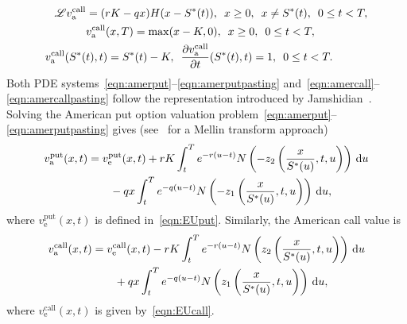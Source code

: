 	 \begin{align}
            \label{eqn:amercall}
            \mathscr{L}v_\text{a}^{\text{call}}&= (rK - qx)H(x-S^*(t)), \enskip x \geq 0, \enskip x \neq S^*(t), \enskip 0 \leq t < T,\\
            \label{eqn:amercallTerminal}
            &v_\text{a}^{\text{call}}(x,T) = \max(x-K,0), \enskip x \geq 0, \enskip 0 \leq t < T,\\
            \label{eqn:amercallpasting}
           v_\text{a}^{\text{call}}(S^*( & t),t) = S^*(t) - K, \enskip \frac{\partial v_\text{a}^{\text{call}}}{\partial t}(S^*(t),t) = 1, \enskip 0 \leq t < T.
    \end{align}
Both PDE systems~\eqref{eqn:amerput}--\eqref{eqn:amerputpasting} and~\eqref{eqn:amercall}--\eqref{eqn:amercallpasting}  follow the representation introduced by Jamshidian~\cite{Jamshidian1992}. Solving the American put option valuation problem~\eqref{eqn:amerput}--\eqref{eqn:amerputpasting} gives (see~\cite{Rodrigo2013} for a Mellin transform approach)
	\begin{equation}
		\label{eqn:americanput}
		\begin{split}
			v_\text{a}^{\text{put}}(x,t) &= v_\text{e}^{\text{put}}(x,t) + rK\int_t^T e^{-r(u-t)}N\left( -z_2\left( \frac{x}{S^*(u)},t,u \right) \right) \, \mathrm d u \\
			& \qquad - qx\int_t^T e^{-q(u-t)}N\left( -z_1\left( \frac{x}{S^*(u)},t,u \right) \right) \, \mathrm d u,
		\end{split}
	\end{equation}
where $v_\text{e}^{\text{put}}(x,t)$ is defined in~\eqref{eqn:EUput}. Similarly, the American call value is
	\begin{equation}
		\label{eqn:americancall}
		\begin{split}
			v_\text{a}^{\text{call}}(x,t) &= v_\text{e}^{\text{call}}(x,t) - rK\int_t^T e^{-r(u-t)}N\left( z_2\left( \frac{x}{S^*(u)},t,u \right) \right) \, \mathrm d u \\
			& \qquad + qx\int_t^T e^{-q(u-t)}N\left( z_1\left( \frac{x}{S^*(u)},t,u \right) \right) \, \mathrm d u,
		\end{split}
	\end{equation}
where $v_\text{e}^{\text{call}}(x,t)$ is given by~\eqref{eqn:EUcall}.

